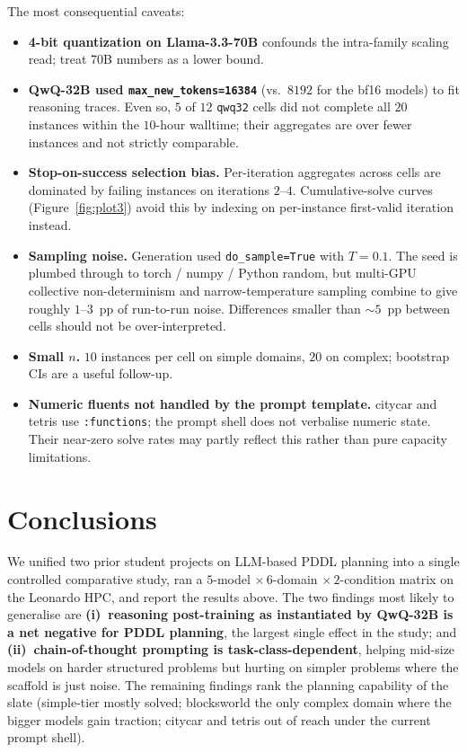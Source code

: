 The most consequential caveats:
\begin{itemize}
\item \textbf{4-bit quantization on Llama-3.3-70B} confounds the
      intra-family scaling read; treat 70B numbers as a lower bound.
\item \textbf{QwQ-32B used \texttt{max\_new\_tokens=16384}} (vs.\ $8192$
      for the bf16 models) to fit reasoning traces. Even so, $5$ of
      $12$ \texttt{qwq32} cells did not complete all $20$ instances
      within the $10$-hour walltime; their aggregates are over fewer
      instances and not strictly comparable.
\item \textbf{Stop-on-success selection bias.} Per-iteration aggregates
      across cells are dominated by failing instances on iterations
      $2$--$4$. Cumulative-solve curves
      (Figure~\ref{fig:plot3}) avoid this by indexing on per-instance
      first-valid iteration instead.
\item \textbf{Sampling noise.} Generation used \texttt{do\_sample=True}
      with $T=0.1$. The seed is plumbed through to torch / numpy /
      Python random, but multi-GPU collective non-determinism and
      narrow-temperature sampling combine to give roughly $1$--$3$~pp
      of run-to-run noise. Differences smaller than $\sim$$5$~pp
      between cells should not be over-interpreted.
\item \textbf{Small $n$.} $10$ instances per cell on simple domains,
      $20$ on complex; bootstrap CIs are a useful follow-up.
\item \textbf{Numeric fluents not handled by the prompt template.}
      citycar and tetris use \texttt{:functions}; the prompt shell
      does not verbalise numeric state. Their near-zero solve rates
      may partly reflect this rather than pure capacity limitations.
\end{itemize}

\section{Conclusions}
\label{sec:conclusions}

We unified two prior student projects on LLM-based PDDL planning into
a single controlled comparative study, ran a $5$-model $\times\,6$-domain
$\times\,2$-condition matrix on the Leonardo HPC, and report the
results above. The two findings most likely to generalise are
\textbf{(i)~reasoning post-training as instantiated by QwQ-32B is a net
negative for PDDL planning}, the largest single effect in the study;
and \textbf{(ii)~chain-of-thought prompting is task-class-dependent},
helping mid-size models on harder structured problems but hurting on
simpler problems where the scaffold is just noise. The remaining
findings rank the planning capability of the slate
(simple-tier mostly solved; blocksworld the only complex domain where
the bigger models gain traction; citycar and tetris out of reach
under the current prompt shell).

